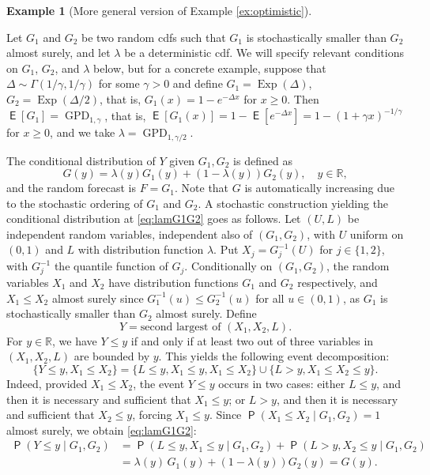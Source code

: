 \documentclass[12pt]{article}
\newcommand{\E}{\operatorname{\mathsf{E}}}
\newcommand{\Q}{\operatorname{\mathsf{P}}}
\newcommand{\R}{\mathbb{R}}
\newcommand{\GPD}{\operatorname{GPD}} %
\newcommand{\Exp}{\operatorname{Exp}} %
\newcommand{\1}{\mathbf{1}} %
\theoremstyle{definition}
\newtheorem{example}[propo]{Example}
\begin{document}
\begin{example}[More general version of Example \ref{ex:optimistic}]\label{ex:14b}

Let $G_1$ and $G_2$ be two random cdfs such that $G_1$ is stochastically smaller than $G_2$ almost surely, and let $\lambda$ be a deterministic cdf. We will specify relevant conditions on $G_1$, $G_2$, and $\lambda$ below, but for a concrete example, suppose that $\Delta \sim \Gamma(1/\gamma,1/\gamma)$ for some $\gamma > 0$ and define $G_1 = \Exp(\Delta)$, $G_2 = \Exp(\Delta/2)$, that is, $G_1(x) = 1 - e^{-\Delta x}$ for $x \ge 0$. Then $\E[G_1] = \GPD_{1,\gamma}$, that is, $\E[G_1(x)] = 1 - \E[e^{-\Delta x}] = 1 - (1+\gamma x)^{-1/\gamma}$ for $x \ge 0$, and we take $\lambda = \GPD_{1,\gamma/2}$.

The conditional distribution of $Y$ given $G_1, G_2$ is defined as
\begin{equation}
\label{eq:lamG1G2}
	G(y) = \lambda(y) G_1(y) + \left(1-\lambda(y)\right) G_2(y), 
	\quad y \in \R,
\end{equation}
and the random forecast is $F = G_1$. Note that $G$ is automatically increasing due to the stochastic ordering of $G_1$ and $G_2$. A stochastic construction yielding the conditional distribution at \eqref{eq:lamG1G2} goes as follows. Let $(U,L)$ be independent random variables, independent also of $(G_1, G_2)$, with $U$ uniform on $(0, 1)$ and $L$ with distribution function $\lambda$. Put $X_j = G_j^{-1}(U)$ for $j \in \{1, 2\}$, with $G_j^{-1}$ the quantile function of $G_j$. Conditionally on $(G_1, G_2)$, the random variables $X_1$ and $X_2$ have distribution functions $G_1$ and $G_2$ respectively, and $X_1 \le X_2$ almost surely since $G_1^{-1}(u) \le G_2^{-1}(u)$ for all $u \in (0, 1)$, as $G_1$ is stochastically smaller than $G_2$ almost surely. Define
\begin{equation}
\label{eq:YLX1X2}
	Y = \text{second largest of $(X_1, X_2, L)$}.
\end{equation}
For $y \in \R$, we have $Y \le y$ if and only if at least two out of three variables in $(X_1, X_2, L)$ are bounded by $y$. This yields the following event decomposition:
\[
	\{Y \le y, X_1 \le X_2\} 
	= \{L \le y, X_1 \le y, X_1 \le X_2\} 
	\cup \{L > y, X_1 \le X_2 \le y\}.
\]
Indeed, provided $X_1 \le X_2$, the event $Y \le y$ occurs in two cases: either $L \le y$, and then it is necessary and sufficient that $X_1 \le y$; or $L > y$, and then it is necessary and sufficient that $X_2 \le y$, forcing $X_1 \le y$. Since $\Q(X_1 \le X_2 \mid G_1, G_2) = 1$ almost surely, we obtain \eqref{eq:lamG1G2}:
\begin{align*}
	\Q(Y \le y \mid G_1, G_2)
	&= \Q(L \le y, X_1 \le y \mid G_1, G_2)
	+ \Q(L > y, X_2 \le y \mid G_1, G_2) \\
	&= \lambda(y) \, G_1(y) + \left(1-\lambda(y)\right) G_2(y) = G(y).
\end{align*}


\end{example}
\end{document}
